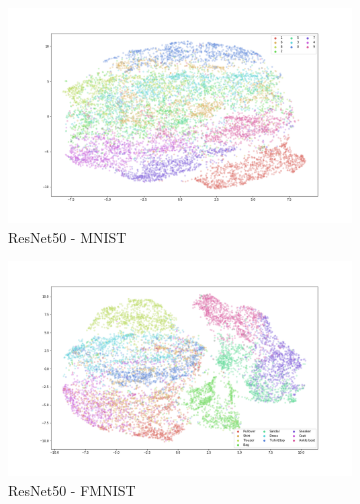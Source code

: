 \documentclass{article}
\theoremstyle{definition}
\begin{document}
\appendix
\begin{figure}[h!]
    \centering
    \begin{subfigure}{.48\textwidth}
        \includegraphics[width=\linewidth]{Final project/img/MNIST_RESNET50_train.png}
        \caption{ResNet50 - MNIST}
    \end{subfigure}
    \begin{subfigure}{.48\textwidth}
        \includegraphics[width=\linewidth]{Final project/img/FMNIST_RESNET50_train.png}
        \caption{ResNet50 - FMNIST}
    \end{subfigure}
    \begin{subfigure}{.48\textwidth}

\end{subfigure}
\end{figure}
\end{document}
